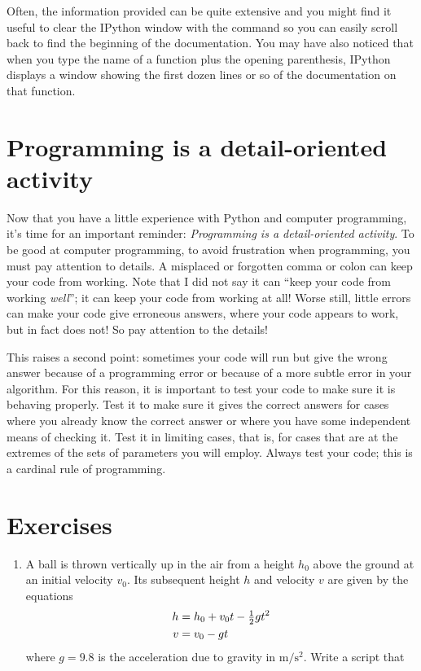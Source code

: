 \documentclass[letterpaper,10pt,english]{sphinxmanual}
\begin{document}
Often, the information provided can be quite extensive and you might find it useful to clear the IPython window with the  command so you can easily scroll back to find the beginning of the documentation.  You may have also noticed that when you type the name of a function plus the opening parenthesis, IPython displays a window showing the first dozen lines or so of the documentation on that function.


\section{Programming is a detail-oriented activity}
\label{chap2/chap2_basics:programming-is-a-detail-oriented-activity}
Now that you have a little experience with Python and computer programming, it's time for an important reminder: \emph{Programming is a detail-oriented activity}.  To be good at computer programming, to avoid frustration when programming, you must pay attention to details.  A misplaced or forgotten comma or colon can keep your code from working.  Note that I did not say it can ``keep your code from working \emph{well}''; it can keep your code from working at all!  Worse still, little errors can make your code give erroneous answers, where your code appears to work, but in fact does not!  So pay attention to the details!

This raises a second point: sometimes your code will run but give the wrong answer because of a programming error or because of a more subtle error in your algorithm.  For this reason, it is important to test your code to make sure it is behaving properly.  Test it to make sure it gives the correct answers for cases where you already know the correct answer or where you have some independent means of checking it.  Test it in limiting cases, that is, for cases that are at the extremes of the sets of parameters you will employ.  Always test your code; this is a cardinal rule of programming.
\newpage

\section{Exercises}
\label{chap2/chap2_basics:exercises}\begin{enumerate}
\item {} 
A ball is thrown vertically up in the air from a height $h_0$ above the ground at an initial velocity $v_0$. Its subsequent height $h$ and velocity $v$ are given by the equations
\begin{gather}
\begin{split}h &= h_0 + v_0t - \tfrac{1}{2}gt^2 \\
v &= v_0 - gt\end{split}\notag
\end{gather}
where $g = 9.8$ is the acceleration due to gravity in $\mathrm{m/s^2}$. Write a script that

\end{enumerate}
\end{document}

